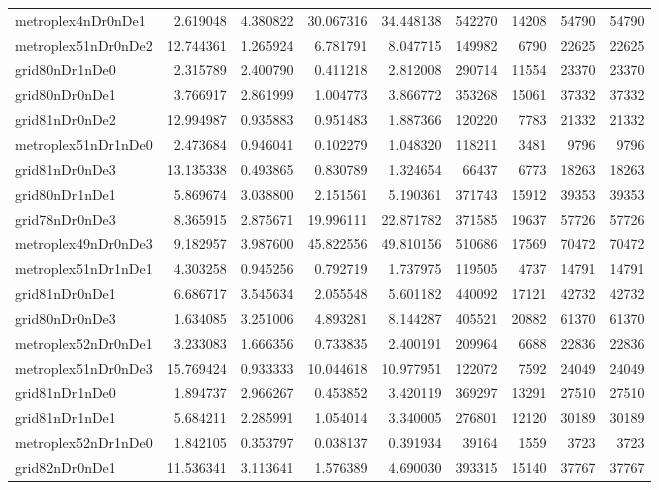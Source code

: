 \begin{longtable}{|l|r|r|r|r|r|r|r|r|}
metroplex4nDr0nDe1 & 2.619048 & 4.380822 & 30.067316 & 34.448138 & 542270 & 14208 & 54790 & 54790 \\
metroplex51nDr0nDe2 & 12.744361 & 1.265924 & 6.781791 & 8.047715 & 149982 & 6790 & 22625 & 22625 \\
grid80nDr1nDe0 & 2.315789 & 2.400790 & 0.411218 & 2.812008 & 290714 & 11554 & 23370 & 23370 \\
grid80nDr0nDe1 & 3.766917 & 2.861999 & 1.004773 & 3.866772 & 353268 & 15061 & 37332 & 37332 \\
grid81nDr0nDe2 & 12.994987 & 0.935883 & 0.951483 & 1.887366 & 120220 & 7783 & 21332 & 21332 \\
metroplex51nDr1nDe0 & 2.473684 & 0.946041 & 0.102279 & 1.048320 & 118211 & 3481 & 9796 & 9796 \\
grid81nDr0nDe3 & 13.135338 & 0.493865 & 0.830789 & 1.324654 & 66437 & 6773 & 18263 & 18263 \\
grid80nDr1nDe1 & 5.869674 & 3.038800 & 2.151561 & 5.190361 & 371743 & 15912 & 39353 & 39353 \\
grid78nDr0nDe3 & 8.365915 & 2.875671 & 19.996111 & 22.871782 & 371585 & 19637 & 57726 & 57726 \\
metroplex49nDr0nDe3 & 9.182957 & 3.987600 & 45.822556 & 49.810156 & 510686 & 17569 & 70472 & 70472 \\
metroplex51nDr1nDe1 & 4.303258 & 0.945256 & 0.792719 & 1.737975 & 119505 & 4737 & 14791 & 14791 \\
grid81nDr0nDe1 & 6.686717 & 3.545634 & 2.055548 & 5.601182 & 440092 & 17121 & 42732 & 42732 \\
grid80nDr0nDe3 & 1.634085 & 3.251006 & 4.893281 & 8.144287 & 405521 & 20882 & 61370 & 61370 \\
metroplex52nDr0nDe1 & 3.233083 & 1.666356 & 0.733835 & 2.400191 & 209964 & 6688 & 22836 & 22836 \\
metroplex51nDr0nDe3 & 15.769424 & 0.933333 & 10.044618 & 10.977951 & 122072 & 7592 & 24049 & 24049 \\
grid81nDr1nDe0 & 1.894737 & 2.966267 & 0.453852 & 3.420119 & 369297 & 13291 & 27510 & 27510 \\
grid81nDr1nDe1 & 5.684211 & 2.285991 & 1.054014 & 3.340005 & 276801 & 12120 & 30189 & 30189 \\
metroplex52nDr1nDe0 & 1.842105 & 0.353797 & 0.038137 & 0.391934 & 39164 & 1559 & 3723 & 3723 \\
grid82nDr0nDe1 & 11.536341 & 3.113641 & 1.576389 & 4.690030 & 393315 & 15140 & 37767 & 37767 \\

\end{longtable}

